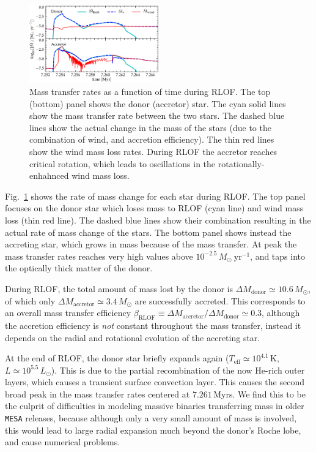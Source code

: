 \documentclass[twocolumn,twocolappendix,trackchanges]{aastex63}
\DeclareRobustCommand{\Figref}[1]{Fig.~\ref{#1}}
\begin{document}
\begin{figure}[htbp]
  \includegraphics[width=0.5\textwidth]{MT}
  \caption{Mass transfer rates as a function of time during RLOF. The top (bottom) panel
    shows the donor (accretor) star. The cyan solid lines show the
    mass transfer rate between the two stars. The dashed blue lines
    show the actual change in the mass of the stars (due to the
    combination of wind, and accretion efficiency). The thin red
    lines show the wind mass loss rates. During RLOF the accretor
    reaches critical rotation, which leads to oscillations in the
    rotationally-enhahnced wind mass loss.}
  \label{fig:MT}
\end{figure}

\Figref{fig:MT} shows the rate of mass change for each star
during RLOF. The top panel focuses on the donor star
which loses mass to RLOF (cyan line) and wind mass loss (thin red
line). The dashed blue lines show their combination resulting in the
actual rate of mass change of the stars.
The bottom panel shows instead the accreting star, which grows in mass
because of the mass transfer. At peak the mass transfer rates reaches very high
values above $10^{-2.5}\,M_\odot\ \mathrm{yr^{-1}}$, and taps into the
optically thick matter of the donor.

During RLOF, the total amount of mass lost by the donor is
$\Delta M_\mathrm{donor} \simeq 10.6\,M_\odot$, of which only
$\Delta M_\mathrm{accretor}\simeq 3.4\,M_\odot$ are successfully
accreted. This corresponds to an overall mass
transfer efficiency
$\beta_\mathrm{RLOF}\equiv \Delta M_\mathrm{accretor}/\Delta M_\mathrm{donor} \simeq 0.3$,
although the accretion efficiency is \emph{not} constant throughout the
mass transfer, instead it depends on the radial and rotational evolution of
the accreting star.

At the end of RLOF, the donor star briefly expands again
($T_\mathrm{eff}\simeq10^{4.1}$\,K, $L\simeq10^{5.5}\,L_\odot$). This
is due to the partial recombination of the now He-rich outer layers,
which causes a transient surface convection layer. This causes the
second broad peak in the mass transfer rates centered at $7.261$\,Myrs. We
find this to be the culprit of difficulties in modeling massive
binaries transferring mass in older \texttt{MESA} releases, because
although only a very small amount of mass is involved, this would lead
to large radial expansion much beyond the donor's Roche lobe, and
cause numerical problems.
\end{document}
